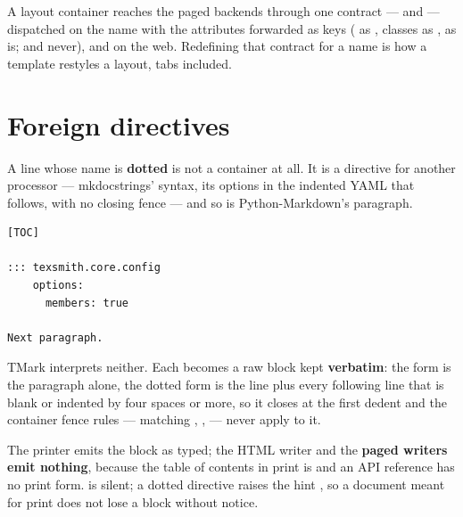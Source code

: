 \documentclass[a4paper,twoside]{article}
\begin{document}
A layout container reaches the paged backends through one contract ---
 and  --- dispatched on the name
with the attributes forwarded as keys ( as , classes as
,  as is;  and  never), and  on the web. Redefining that contract for a name is how a template restyles
a layout, tabs included.
\section{Foreign directives}
A \tscodeinline{:::} line whose name is \textbf{dotted} is not a container at all. It is a
directive for another processor --- mkdocstrings' syntax, its options in the
indented YAML that follows, with no closing fence --- and so is
Python-Markdown's \tscodeinline{[TOC]} paragraph.
\begin{tscode}[lang=md, engine=pygments]
\begin{Verbatim}[commandchars=\\\{\},breaklines, breakanywhere, commandchars=\\\{\}]
[TOC]

::: texsmith.core.config
    options:
      members: true

Next paragraph.
\end{Verbatim}
\end{tscode}
TMark interprets neither. Each becomes a raw block kept \textbf{verbatim}: the
\tscodeinline{[TOC]} form is the paragraph alone, the dotted form is the \tscodeinline{:::} line plus
every following line that is blank or indented by four spaces or more, so it
closes at the first dedent and the container fence rules --- matching \tscodeinline{:::},
,  --- never apply to it.

The printer emits the block as typed; the HTML writer and the \textbf{paged writers
emit nothing}, because the table of contents in print is  and an
API reference has no print form. \tscodeinline{[TOC]} is silent; a dotted directive raises
the hint , so a document meant for print does not lose a
block without notice.
\end{document}
